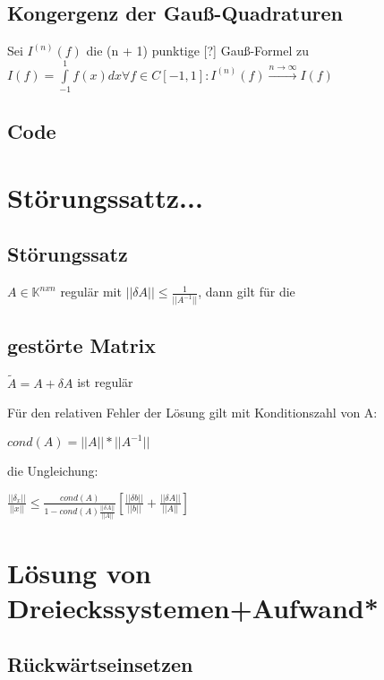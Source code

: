 \documentclass[12pt,a4paper]{article} %
\newcommand*\tab[1][1cm]{\hspace*{#1}}
\begin{document}
	
	\subsection{Kongergenz der Gauß-Quadraturen}
	
	Sei $I^{(n)}(f)$ die (n + 1) punktige [?] Gauß-Formel zu $I(f) = \int\limits_{-1}^1f(x)dx \forall f \in C[-1, 1]: I^{(n)}(f) \xrightarrow{n \rightarrow \infty} I(f)$
	
	\subsection{Code}
	
	\newpage
	
	\section{Störungssattz...}
	
	\subsection{Störungssatz}
	
	$A \in \mathbb{K}^{n x n}$ regulär mit $||\delta A|| \le \frac{1}{||A^{-1}||}$, dann gilt für die
	
	\subsection{gestörte Matrix}
	
	$\tilde{A} = A + \delta A$ ist regulär
	
	Für den relativen Fehler der Lösung gilt mit Konditionszahl von A:
	
	\tab $cond(A) = ||A|| * ||A^{-1}||$
	
	die Ungleichung:
	
	\tab $\frac{||\delta_x||}{||x||} \le \frac{cond(A)}{1 - cond(A) \frac{||\delta A||}{||A||}}\left[ \frac{||\delta b||}{||b||} + \frac{||\delta A||}{||A||}\right] $
	
	\newpage
	
	\section{Lösung von Dreieckssystemen+Aufwand*}
	
	\subsection{Rückwärtseinsetzen}
	
\end{document}
